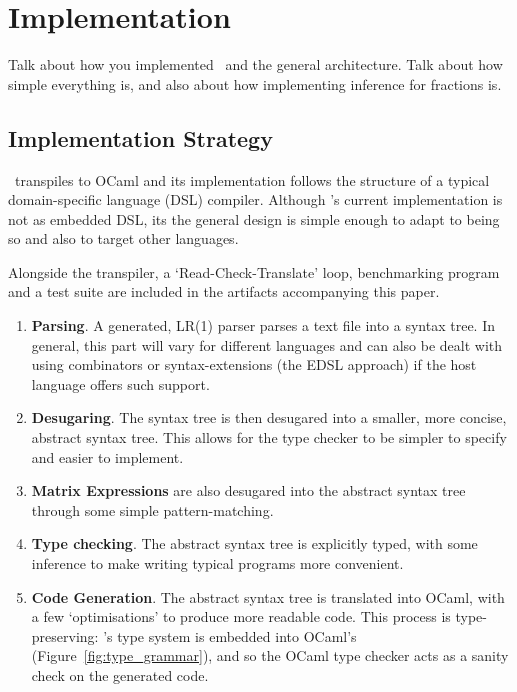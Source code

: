 \section{Implementation}\label{sec:implementation}

Talk about how you implemented \lang\ and the general
architecture. Talk about how simple everything is, and also
about how implementing inference for fractions is. 

\subsection{Implementation Strategy}

\lang\ transpiles to OCaml and its implementation follows the structure of a
typical domain-specific language (DSL) compiler. Although \lang's current
implementation is not as embedded DSL, its the general design is simple enough
to adapt to being so and also to target other languages.

Alongside the transpiler, a `Read-Check-Translate' loop, benchmarking program
and a test suite are included in the artifacts accompanying this paper.

\begin{enumerate}

    \item \textbf{Parsing}. A generated, LR(1) parser parses a text file into a
        syntax tree. In general, this part will vary for different languages
        and can also be dealt with using combinators or syntax-extensions (the
        EDSL approach) if the host language offers such support.

    \item \textbf{Desugaring}. The syntax tree is then desugared into a
        smaller, more concise, abstract syntax tree. This allows for the type
        checker to be simpler to specify and easier to implement.

    \item \textbf{Matrix Expressions} are also desugared into the abstract
        syntax tree through some simple pattern-matching.

    \item \textbf{Type checking}. The abstract syntax tree is explicitly typed,
        with some inference to make writing typical programs more convenient.

    \item \textbf{Code Generation}. The abstract syntax tree is translated into
        OCaml, with a few `optimisations' to produce more readable code. This
        process is type-preserving: \lang's type system is embedded into
        OCaml's (Figure~\ref{fig:type_grammar}), and so the OCaml type checker
        acts as a sanity check on the generated code.

\end{enumerate}

